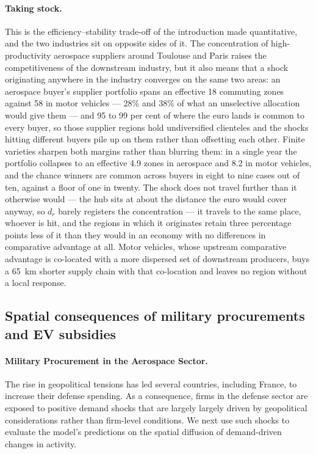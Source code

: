 \paragraph{Taking stock.} This is the efficiency--stability trade-off of the introduction made quantitative, and the two industries sit on opposite sides of it. The concentration of high-productivity aerospace suppliers around Toulouse and Paris raises the competitiveness of the downstream industry, but it also means that a shock originating anywhere in the industry converges on the same two areas: an aerospace buyer's supplier portfolio spans an effective 18 commuting zones against 58 in motor vehicles --- 28\% and 38\% of what an unselective allocation would give them --- and 95 to 99 per cent of where the euro lands is common to every buyer, so those supplier regions hold undiversified clienteles and the shocks hitting different buyers pile up on them rather than offsetting each other. Finite varieties sharpen both margins rather than blurring them: in a single year the portfolio collapses to an effective 4.9 zones in aerospace and 8.2 in motor vehicles, and the chance winners are common across buyers in eight to nine cases out of ten, against a floor of one in twenty. The shock does not travel further than it otherwise would --- the hub sits at about the distance the euro would cover anyway, so $d_{r}$ barely registers the concentration --- it travels to the same place, whoever is hit, and the regions in which it originates retain three percentage points less of it than they would in an economy with no differences in comparative advantage at all. Motor vehicles, whose upstream comparative advantage is co-located with a more dispersed set of downstream producers, buys a 65~km shorter supply chain with that co-location and leaves no region without a local response.
 

\subsection{Spatial consequences of military procurements and EV subsidies}

\paragraph{Military Procurement in the Aerospace Sector.} The rise in geopolitical tensions has led several countries, including France, to increase their defense spending. As a consequence, firms in the defense sector are exposed to positive demand shocks that are largely largely driven by geopolitical considerations rather than firm-level conditions. We next use such shocks to evaluate the model's predictions on the spatial diffusion of demand-driven changes in activity.

